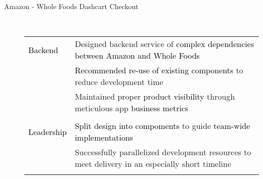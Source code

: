 \documentclass[11pt]{article}
\begin{document}
\begin{description}
\begin{description}
                \item[Amazon - Whole Foods Dashcart Checkout] \hfill \\
                \textcolor{gray}{
                    \begin{tabular}{l|l}
                        \\[-1.0mm]
                        \textcolor{black}{Backend}
                            & Designed backend service of \textcolor{black}{complex dependencies between Amazon and Whole Foods} \\
                            & \textcolor{black}{Recommended re-use of existing components} to reduce development time \\
                            & Maintained proper \textcolor{black}{product visibility} through meticulous app \textcolor{black}{business metrics} \\
                        \\[-1.7mm]
                        \textcolor{black}{Leadership}
                            & \textcolor{black}{Split design into compoments} to guide \textcolor{black}{team-wide implementations}\\
                            & Successfully parallelized development resources to meet delivery in an especially short timeline\\
                        \\[-1.0mm]
                    \end{tabular}
                }


\end{description}
\end{description}
\end{document}
